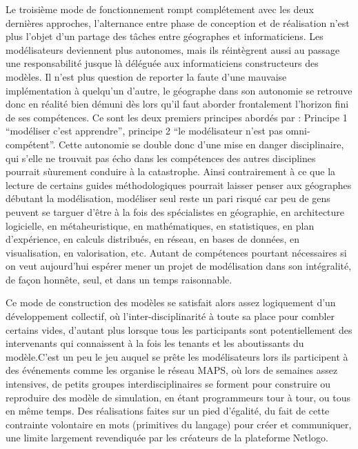 Le troisième mode de fonctionnement rompt complétement avec les deux dernières approches, l'alternance entre phase de conception et de réalisation n'est plus l'objet d'un partage des tâches entre géographes et informaticiens. Les modélisateurs deviennent plus autonomes, mais ils réintègrent aussi au passage une responsabilité jusque là déléguée aux informaticiens constructeurs des modèles. Il n'est plus question de reporter la faute d'une mauvaise implémentation à quelqu'un d'autre, le géographe dans son autonomie se retrouve donc en réalité bien démuni dès lors qu'il faut aborder frontalement l'horizon fini de ses compétences. Ce sont les deux premiers principes abordés par \textcite[77]{Banos2013} : Principe 1 \enquote{modéliser c'est apprendre}, principe  2 \enquote{le modélisateur n'est pas omni-compétent}. Cette autonomie se double donc d'une mise en danger disciplinaire, qui s'elle ne trouvait pas écho dans les compétences des autres disciplines pourrait sùurement conduire à la catastrophe. Ainsi contrairement à ce que la lecture de certains guides méthodologiques pourrait laisser penser aux géographes débutant la modélisation, modéliser seul reste un pari risqué car peu de gens peuvent se targuer d'être à la fois des spécialistes en géographie, en architecture logicielle, en métaheuristique, en mathématiques, en statistiques, en plan d'expérience, en calculs distribués, en réseau, en bases de données, en visualisation, en valorisation, etc. Autant de compétences pourtant nécessaires si on veut aujourd'hui espérer mener un projet de modélisation dans son intégralité, de façon honnête, seul, et dans un temps raisonnable.


Ce mode de construction des modèles se satisfait alors assez logiquement d'un développement collectif, où l'inter-disciplinarité à toute sa place pour combler certains vides, d'autant plus lorsque tous les participants sont potentiellement des intervenants qui connaissent à la fois les tenants et les aboutissants du modèle.C'est un peu le jeu auquel se prête les modélisateurs lors ils participent à des événements comme les organise le réseau MAPS, où lors de semaines assez intensives, de petits groupes interdisciplinaires se forment pour construire ou reproduire des modèle de simulation, en étant programmeurs tour à tour, ou tous en même temps. Des réalisations faites sur un pied d'égalité, du fait de cette contrainte volontaire en mots (primitives du langage) pour créer et communiquer, une limite largement revendiquée par les créateurs de la plateforme Netlogo.

